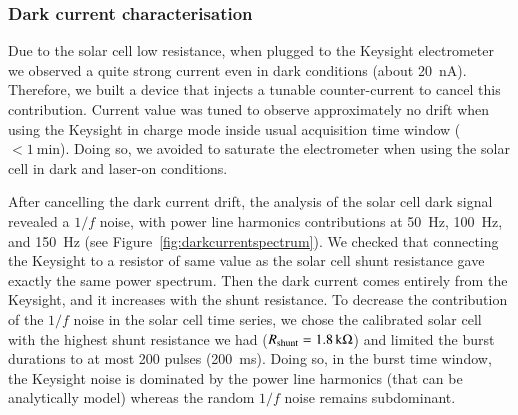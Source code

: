
\subsubsection{Dark current characterisation}


Due to the solar cell low resistance, when plugged to the Keysight electrometer we observed a quite strong current even in dark conditions (about \SI{20}{\nano\ampere}). Therefore, we built a device that injects a tunable counter-current to cancel this contribution. Current value was tuned to observe approximately no drift when using the Keysight in charge mode inside usual acquisition time window ($< \SI{1}{\minute}$). Doing so, we avoided to saturate the electrometer when using the solar cell in dark and laser-on conditions. 


After cancelling the dark current drift, the analysis of the solar cell dark signal revealed a $1/f$ noise, with power line harmonics contributions at \SI{50}{\hertz},  \SI{100}{\hertz}, and \SI{150}{\hertz} (see Figure~\ref{fig:darkcurrentspectrum}). 
We checked that connecting the Keysight to a resistor of same value as the solar cell shunt resistance gave exactly the same
power spectrum. Then the dark current comes entirely from the Keysight, and it increases with the shunt resistance. To decrease the contribution of the $1/f$ noise in the solar cell time series, we chose the calibrated solar cell with the highest shunt resistance we had ($R_{\rm shunt} = \SI{1.8}{\kilo\ohm}$) and limited the burst durations to at most 200 pulses (\SI{200}{\ms}). Doing so, in the burst time window, the Keysight noise is dominated by the power line harmonics (that can be analytically model) whereas the random $1/f$ noise remains subdominant.



